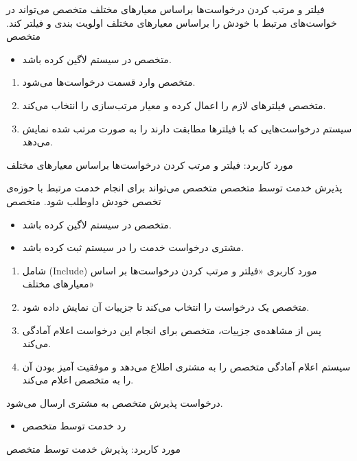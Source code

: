 \usecase
{فیلتر و مرتب کردن درخواست‌ها براساس معیارهای مختلف}
{}
{متخصص می‌تواند در خواست‌های مرتبط با خودش را براساس معیارهای مختلف اولویت بندی و فیلتر کند.}
{متخصص}
{}
{	
	\begin{itemize}
		\vspace*{-0.6cm}
		\item 
		متخصص در سیستم لاگین کرده باشد.
	\end{itemize}
}
{
	\vspace*{-0.6cm}
	\begin{enumerate}
		\item 
		متخصص وارد قسمت درخواست‌ها می‌شود.
		\item
		متخصص فیلترهای لازم را اعمال کرده و معیار مرتب‌سازی را انتخاب می‌کند.
		\item
		سیستم درخواست‌هایی که با فیلترها مطابقت دارند را به صورت مرتب شده نمایش می‌دهد.
	\end{enumerate}
}
{}
{}
{
	مورد کاربرد: فیلتر و مرتب کردن درخواست‌ها براساس معیارهای مختلف
}


\usecase
{پذیرش خدمت توسط متخصص}
{}
{متخصص می‌تواند برای انجام خدمت مرتبط با حوزه‌ی تخصص خودش داوطلب شود.}
{متخصص}
{}
{	
	\begin{itemize}
		\vspace*{-0.6cm}
		\item 
		متخصص در سیستم لاگین کرده باشد.
		\item
		مشتری درخواست خدمت را در سیستم ثبت کرده باشد.
	\end{itemize}
}
{
	\vspace*{-0.6cm}
	\begin{enumerate}
		\item 
		شامل (Include) مورد کاربری «فیلتر و مرتب کردن درخواست‌ها بر اساس معیارهای مختلف»
		\item
		متخصص یک درخواست را انتخاب می‌کند تا جزییات آن نمایش داده شود.
		\item
		پس از مشاهده‌ی جزییات، متخصص برای انجام این درخواست اعلام آمادگی می‌کند.
		\item
		سیستم اعلام آمادگی متخصص را به مشتری اطلاع می‌دهد و موفقیت آمیز بودن آن را به متخصص اعلام می‌کند.
	\end{enumerate}
}
{درخواست پذیرش متخصص به مشتری ارسال می‌شود.}
{
	\begin{itemize}
		\vspace*{-0.6cm}
		\item
		رد خدمت توسط متخصص
	\end{itemize}
}
{
	مورد کاربرد: پذیرش خدمت توسط متخصص
}

